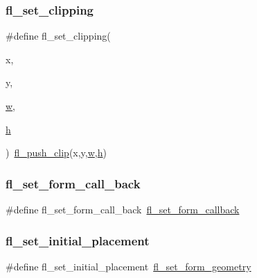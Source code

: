 \subsubsection{\texorpdfstring{fl\+\_\+set\+\_\+clipping}{fl\_set\_clipping}}
{\footnotesize\ttfamily \#define fl\+\_\+set\+\_\+clipping(\begin{DoxyParamCaption}\item[{}]{x,  }\item[{}]{y,  }\item[{}]{\hyperlink{forms_8_h_aac374e320caaadeca4874add33b62af2}{w},  }\item[{}]{\hyperlink{forms_8_h_a7e427ba5b307f9068129699250690066}{h} }\end{DoxyParamCaption})~\hyperlink{group__fl__drawings_gabe60242ba3b975800717b95cb6bc06d2}{fl\+\_\+push\+\_\+clip}(x,y,\hyperlink{forms_8_h_aac374e320caaadeca4874add33b62af2}{w},\hyperlink{forms_8_h_a7e427ba5b307f9068129699250690066}{h})}

\mbox{\label{forms_8_h_adb59b360fa052eeab762df4ca07950a4}} 
\subsubsection{\texorpdfstring{fl\+\_\+set\+\_\+form\+\_\+call\+\_\+back}{fl\_set\_form\_call\_back}}
{\footnotesize\ttfamily \#define fl\+\_\+set\+\_\+form\+\_\+call\+\_\+back~\hyperlink{forms_8_h_a967f084644d6c1d984d99b4f6d1ad388}{fl\+\_\+set\+\_\+form\+\_\+callback}}

\mbox{\label{forms_8_h_a378a48c4ae19fa07a23cd8ecccb6b6df}} 
\subsubsection{\texorpdfstring{fl\+\_\+set\+\_\+initial\+\_\+placement}{fl\_set\_initial\_placement}}
{\footnotesize\ttfamily \#define fl\+\_\+set\+\_\+initial\+\_\+placement~\hyperlink{forms_8_h_a5498d795dcac917c76f803b45338fb0a}{fl\+\_\+set\+\_\+form\+\_\+geometry}}

